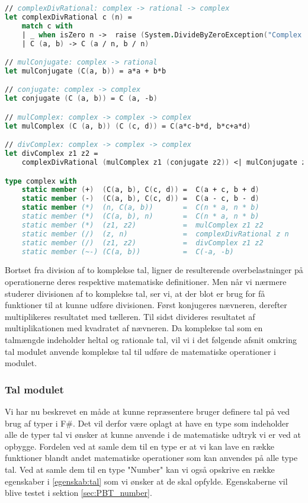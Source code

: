 \begin{lstlisting}[language={FSharp}, 
    label={complex_operations},
    caption={Overskrivning af operationer på komplekse tal}]
// complexDivRational: complex -> rational -> complex
let complexDivRational c (n) = 
    match c with
    | _ when isZero n ->  raise (System.DivideByZeroException("Complex.divRational: Cannot divide by zero!"))
    | C (a, b) -> C (a / n, b / n) 

// mulConjugate: complex -> rational
let mulConjugate (C(a, b)) = a*a + b*b

// conjugate: complex -> complex
let conjugate (C (a, b)) = C (a, -b)

// mulComplex: complex -> complex -> complex
let mulComplex (C (a, b)) (C (c, d)) = C(a*c-b*d, b*c+a*d)

// divComplex: complex -> complex -> complex
let divComplex z1 z2 =
    complexDivRational (mulComplex z1 (conjugate z2)) <| mulConjugate z2

type complex with
    static member (+)  (C(a, b), C(c, d)) =  C(a + c, b + d)
    static member (-)  (C(a, b), C(c, d)) =  C(a - c, b - d)
    static member (*)  (n, C(a, b))       =  C(n * a, n * b)
    static member (*)  (C(a, b), n)       =  C(n * a, n * b)
    static member (*)  (z1, z2)           =  mulComplex z1 z2
    static member (/)  (z, n)             =  complexDivRational z n
    static member (/)  (z1, z2)           =  divComplex z1 z2 
    static member (~-) (C(a, b))          =  C(-a, -b)
\end{lstlisting}    

Bortset fra division af to komplekse tal, ligner de resulterende overbelastninger på operationerne deres respektive matematiske definitioner. Men når vi nærmere studerer divisionen af to komplekse tal, ser vi, at der blot er brug for få funktioner til at kunne udføre divisionen. Først konjugeres nævneren, derefter multiplikeres resultatet med tælleren. Til sidst divideres resultatet af multiplikationen med kvadratet af nævneren. Da komplekse tal som en talmængde indeholder heltal og rationale tal, vil vi i det følgende afsnit omkring tal modulet anvende komplekse tal til udføre de matematiske operationer i modulet.


\subsubsection{Tal modulet}
Vi har nu beskrevet en måde at kunne repræsentere bruger definere tal på ved brug af typer i F\#. Det vil derfor være oplagt at have en type som indeholder alle de typer tal vi ønsker at kunne anvende i de matematiske udtryk vi er ved at opbygge. Fordelen ved at samle dem til en type er at vi kan lave en række funktioner blandt andet matematiske operationer som kan anvendes på alle type tal. Ved at samle dem til en type "Number" kan vi også opskrive en række egenskaber i \ref{egenskab:tal} som vi ønsker at de skal opfylde. Egenskaberne vil blive testet i sektion \ref{sec:PBT_number}.


